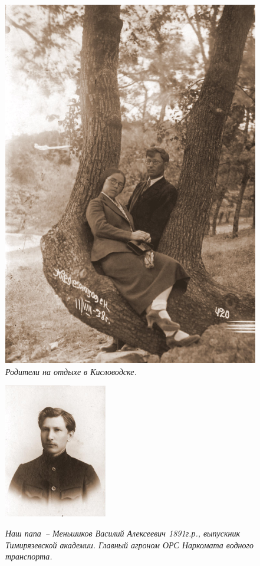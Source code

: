 \documentclass[utf8x, 12pt]{G7-32a} %
\begin{document}
\begin{figure}[h!]
\begin{minipage}[h]{70mm}
       \includegraphics[width=\linewidth]{inc/Menshekovy/12.jpg} 
       \itshape{Родители на отдыхе в Кисловодске.}
   \end{minipage}
   \hfill
    \begin{minipage}[h!]{50mm}
        \begin{center}
        \includegraphics[width=45mm]{inc/Menshekovy/13a.JPG}
        \end{center}
        \itshape{Наш папа~-- Меньшиков Василий Алексеевич 1891г.р., выпускник Тимирязевской академии. Главный агроном ОРС Наркомата водного транспорта.}
    \end{minipage}

\end{figure}
\end{document}
